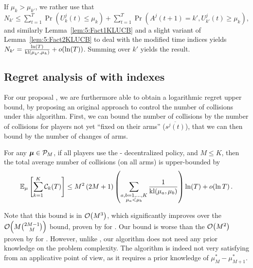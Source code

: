 \begin{smallproof}
  If $\mu_k > \mu_{k'}$, we rather use that
  $N_{k'} \leq \sum\limits_{t=1}^T \Pr\left(U_{k}^j(t) \leq \mu_{k}\right) + \sum\limits_{t=1}^T \Pr\left(A^j(t+1) = k', U_{k'}^j(t) \geq \mu_{k}\right)$,
  and similarly Lemma~\ref{lem:5:Fact1KLUCB} and a slight variant of Lemma~\ref{lem:5:Fact2KLUCB} to deal with the modified time indices yields
  $N_{k'} = \frac{\ln(T)}{\mathrm{kl}(\mu_{k'},\mu_{k})} + o(\ln(T))$.
  Summing over $k'$ yields the result.
\end{smallproof}


\subsection{Regret analysis of \MCTopM{} with \klUCB{} indexes}\label{sub:5:UpperBoundCollisions}

For our proposal \MCTopM, we are furthermore able to obtain a logarithmic regret upper bound, by proposing an original approach to control the number of collisions under this algorithm.
First, we can bound the number of collisions by the number of collisions for players not yet ``fixed on their arms'' ($\overline{s^j(t)}$),
that we can then bound by the number of changes of arms.

\begin{lemma}\label{lem:5:collisionsMCTopM}
\begin{leftbar}[lemmabar]  %
  For any $\boldsymbol{\mu}\in\mathcal{P}_M$,
  if all players use the
  \MCTopM-\klUCB{} decentralized policy,
  and $M \leq K$,
  then the total average number of collisions (on all arms)
  is upper-bounded by
  \begin{equation}
    \mathbb{E}_{\mu}\left[\sum_{k=1}^K \mathcal{C}_k(T)\right]
    \leq M^2\left(2 M + 1\right) \left(\sum_{\substack{a,b=1,\dots,K\\\mu_a < \mu_b}} \frac{1}{\mathrm{kl}(\mu_a,\mu_b)}\right) \ln(T) + \mathop{}\mathopen{}o\mathopen{}\left(\ln T\right).
  \end{equation}
\end{leftbar}  %
\end{lemma}

Note that this bound is in $\mathop{}\mathopen{}\mathcal{O}\mathopen{}\left(M^3\right)$,
which significantly improves over the $\mathop{}\mathopen{}\mathcal{O}\mathopen{}\left(M{2M-1 \choose M}\right)$ bound, proven by \cite{Anandkumar11} for \rhoRand.
Our bound is worse than the $\mathop{}\mathopen{}\mathcal{O}\mathopen{}\left(M^2\right)$ proven by \cite{Rosenski16} for \MusicalChair{}. %
However, unlike \MusicalChair, our algorithm does not need any prior knowledge on the problem complexity.
The \MusicalChair{} algorithm is indeed not very satisfying from an applicative point of view, as it requires a prior knowledge of $\mu^*_{M}-\mu^*_{M+1}$.


